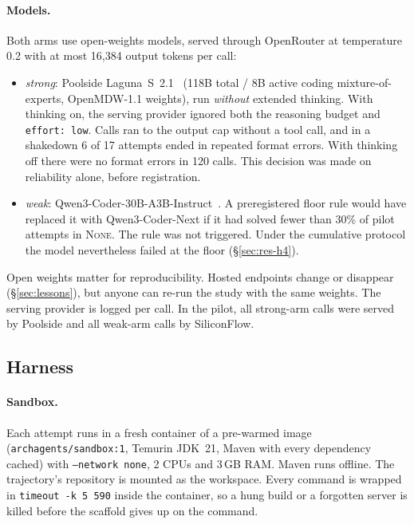 \documentclass[10pt]{article}
\newcommand{\NONE}{\textsc{None}}
\newcommand{\code}[1]{\texttt{#1}}
\begin{document}
\paragraph{Models.} Both arms use open-weights models, served through OpenRouter at temperature
0.2 with at most 16,384 output tokens per call:
\begin{itemize}[itemsep=1pt]
  \item \emph{strong}: Poolside Laguna~S~2.1~\citep{poolside2026laguna} (118B total / 8B active
    coding mixture-of-experts, OpenMDW-1.1 weights), run \emph{without} extended thinking. With
    thinking on, the serving provider ignored both the reasoning budget and \code{effort: low}. Calls
    ran to the output cap without a tool call, and in a shakedown 6 of 17 attempts ended in
    repeated format errors. With thinking off there were no format errors in 120 calls. This
    decision was made on reliability alone, before registration.
  \item \emph{weak}: Qwen3-Coder-30B-A3B-Instruct~\citep{qwen3report}. A preregistered floor rule would have replaced it with
    Qwen3-Coder-Next if it had solved fewer than 30\% of pilot attempts in \NONE. The rule was not
    triggered. Under the cumulative protocol the model nevertheless failed at the floor
    (\S\ref{sec:res-h4}).
\end{itemize}
Open weights matter for reproducibility. Hosted endpoints change or disappear (\S\ref{sec:lessons}),
but anyone can re-run the study with the same weights. The serving provider is logged per call. In
the pilot, all strong-arm calls were served by Poolside and all weak-arm calls by SiliconFlow.

\subsection{Harness}\label{sec:harness}

\paragraph{Sandbox.} Each attempt runs in a fresh container of a pre-warmed image
(\code{archagents/sandbox:1}, Temurin JDK~21, Maven with every dependency cached) with
\code{--network none}, 2 CPUs and 3\,GB RAM. Maven runs offline. The trajectory's repository is
mounted as the workspace. Every command is wrapped in \code{timeout -k 5 590} inside the container,
so a hung build or a forgotten server is killed before the scaffold gives up on the command.
\end{document}
